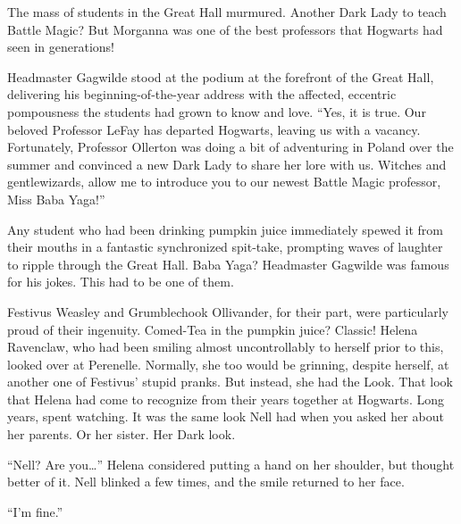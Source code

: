 The mass of students in the Great Hall murmured. Another Dark Lady to teach Battle Magic? But Morganna was one of the best professors that Hogwarts had seen in generations!

Headmaster Gagwilde stood at the podium at the forefront of the Great Hall, delivering his beginning-of-the-year address with the affected, eccentric pompousness the students had grown to know and love. “Yes, it is true. Our beloved Professor LeFay has departed Hogwarts, leaving us with a vacancy. Fortunately, Professor Ollerton was doing a bit of adventuring in Poland over the summer and convinced a new Dark Lady to share her lore with us. Witches and gentlewizards, allow me to introduce you to our newest Battle Magic professor, Miss Baba Yaga!”

Any student who had been drinking pumpkin juice immediately spewed it from their mouths in a fantastic synchronized spit-take, prompting waves of laughter to ripple through the Great Hall. Baba Yaga? Headmaster Gagwilde was famous for his jokes. This had to be one of them.

Festivus Weasley and Grumblechook Ollivander, for their part, were particularly proud of their ingenuity. Comed-Tea in the pumpkin juice? Classic! Helena Ravenclaw, who had been smiling almost uncontrollably to herself prior to this, looked over at Perenelle. Normally, she too would be grinning, despite herself, at another one of Festivus’ stupid pranks. But instead, she had the Look. That look that Helena had come to recognize from their years together at Hogwarts. Long years, spent watching. It was the same look Nell had when you asked her about her parents. Or her sister. Her Dark look.

“Nell? Are you…” Helena considered putting a hand on her shoulder, but thought better of it. Nell blinked a few times, and the smile returned to her face.

“I’m fine.”

